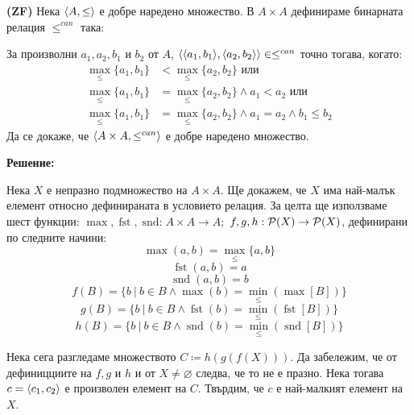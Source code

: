 \begin{problem}
\textbf{(ZF)}
Нека $\langle A, \leq \rangle$ е добре наредено множество.
В $A \times A$ дефинираме бинарната релация $\leq^{can}$ така:

\smallbreak
\quad
За произволни $a_1, a_2, b_1$ и $b_2$ от $A$, $\langle \langle a_1, b_1 \rangle, \langle a_2, b_2 \rangle \rangle \in \leq^{can}$
точно тогава, когато:
\begin{align*}
\operatorname{max}_{\leq}\{a_1, b_1\} & < \operatorname{max}_{\leq}\{a_2, b_2\} \text{ или} \\
\operatorname{max}_{\leq}\{a_1, b_1\} & = \operatorname{max}_{\leq}\{a_2, b_2\} \land a_1 < a_2 \text{ или} \\
\operatorname{max}_{\leq}\{a_1, b_1\} & = \operatorname{max}_{\leq}\{a_2, b_2\} \land a_1 = a_2 \land b_1 \leq b_2
\end{align*}
\quad
Да се докаже, че $\langle A \times A, \leq^{can} \rangle$ е добре наредено множество.
\end{problem}

\textbf{Решение:}

\smallbreak
\quad
Нека $X$ е непразно подмножество на $A \times A$. Ще докажем, че $X$ има най-малък елемент относно дефинираната в условието релация.
За целта ще използваме шест функции: $\operatorname{max}, \operatorname{fst}, \operatorname{snd:} A \times A \to A;$
$f, g, h: \mathcal{P}(X) \to \mathcal{P}(X)$, дефинирани по следните начини:
\[
\operatorname{max}(a, b) = \operatorname{max}_{\leq}\{a, b\}
\]
\[
\operatorname{fst}(a, b) = a
\]
\[
\operatorname{snd}(a, b) = b
\]
\[
f(B) = \{b\ |\ b \in B \land \operatorname{max}(b) = \operatorname{min}_{\leq}(\operatorname{max}[B])\}
\]
\[
g(B) = \{b\ |\ b \in B \land \operatorname{fst}(b) = \operatorname{min}_{\leq}(\operatorname{fst}[B])\}
\]
\[
h(B) = \{b\ |\ b \in B \land \operatorname{snd}(b) = \operatorname{min}_{\leq}(\operatorname{snd}[B])\}
\]

\quad
Нека сега разгледаме множеството $C \coloneq h(g(f(X)))$.
Да забележим, че от дефиницциите на $f, g$ и $h$ и от $X \neq \varnothing$ следва, че то не е празно.
Нека тогава $c = \langle c_1, c_2 \rangle$ е произволен елемент на $C$.
Твърдим, че $c$ е най-малкият елемент на $X$.

